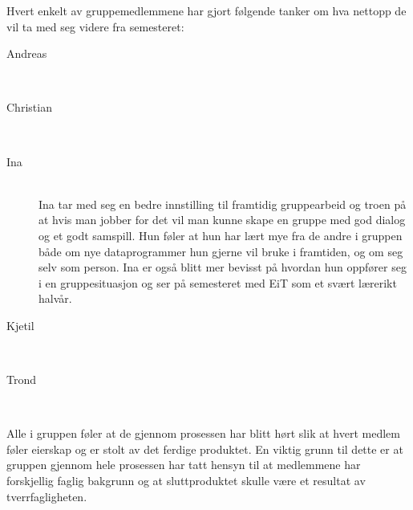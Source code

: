 Hvert enkelt av gruppemedlemmene har gjort følgende tanker om hva nettopp de vil ta med seg videre fra semesteret:
\begin{description}
\item[Andreas] \hfill \\

\item[Christian] \hfill \\

\item[Ina] \hfill \\
Ina tar med seg en bedre innstilling til framtidig gruppearbeid og troen på at hvis man jobber for 
det vil man kunne skape en gruppe med god dialog og et godt samspill. Hun føler at hun har lært mye fra de andre
i gruppen både om nye dataprogrammer hun gjerne vil bruke i framtiden, og om seg selv som person.
Ina er også blitt mer bevisst på hvordan hun oppfører seg i en gruppesituasjon og ser på semesteret med
EiT som et svært lærerikt halvår.

\item[Kjetil] \hfill \\

\item[Trond] \hfill \\

\end{description}
Alle i gruppen føler at de gjennom prosessen har blitt hørt slik at hvert medlem føler eierskap og er stolt av det ferdige produktet. 
En viktig grunn til dette er at gruppen gjennom hele prosessen har tatt hensyn til at medlemmene har forskjellig faglig bakgrunn og 
at sluttproduktet skulle være et resultat av tverrfagligheten.


